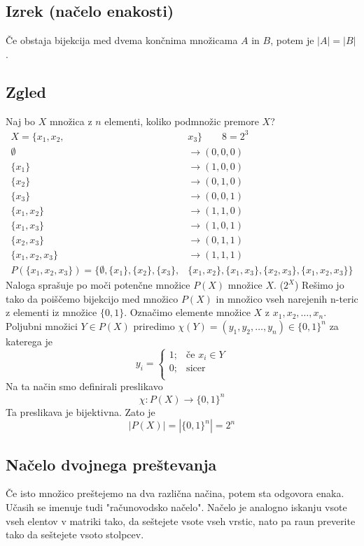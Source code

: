 \subsection{Izrek (načelo enakosti)}
Če obstaja bijekcija med dvema končnima množicama $A$ in $B$, potem je $|A| = |B|$.


\subsection{Zgled}
Naj bo $X$ množica z $n$ elementi, koliko podmnožic premore $X$?
\begin{align*}
    X = \{x_1, x_2, & x_3\} \text{ } \text{ } \text{ } 8 = 2^3 \\[1em]
    \emptyset & \to (0,0,0) \\
    \{x_1\} & \to (1,0,0) \\
    \{x_2\} & \to (0,1,0) \\
    \{x_3\} & \to (0,0,1) \\
    \{x_1,x_2\} & \to (1,1,0) \\
    \{x_1,x_3\} & \to (1,0,1) \\
    \{x_2,x_3\} & \to (0,1,1) \\
    \{x_1,x_2,x_3\} & \to (1,1,1) \\[1em]
    P(\{x_1,x_2,x_3\}) = \{
        \emptyset, \{x_1\}, \{x_2\}, \{x_3\}, & \{x_1,x_2\}, \{x_1,x_3\}, \{x_2,x_3\}, \{x_1,x_2,x_3\}
    \}
\end{align*}
Naloga sprašuje po moči potenčne množice $P(X)$ množice $X$. ($2^X$)
Rešimo jo tako da poiščemo bijekcijo med množico $P(X)$ in množico vseh narejenih n-teric z elementi iz množice $\{0, 1\}$.
Označimo elemente množice $X$ z $x_1, x_2, \dots, x_n$. Poljubni množici $Y \in P(X)$ priredimo $\chi(Y) = (y_1, y_2, \dots, y_n) \in \{0, 1\}^n$ za katerega je
$$
y_i = 
\begin{cases}
    1; & \text{če } x_i \in Y \\
    0; & \text{sicer } \\
\end{cases}
$$  
Na ta način smo definirali preslikavo 
$$
\chi : P(X) \to \{0, 1\}^n
$$
Ta preslikava je bijektivna. Zato je
$$
|P(X)| = |\{0, 1\}^n| = 2^n
$$




\subsection{Načelo dvojnega preštevanja}
Če isto množico preštejemo na dva različna načina, potem sta odgovora enaka.
Učasih se imenuje tudi "računovodsko načelo".
Načelo je analogno iskanju vsote vseh elentov v matriki tako, da seštejete vsote vseh vrstic, nato pa raun preverite tako da seštejete vsoto stolpcev.


